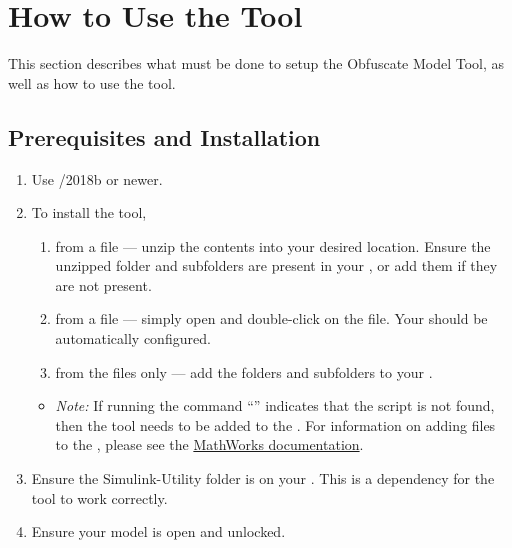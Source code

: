 \documentclass{article}
\makeatletter
\newcommand{\ToolName}{Obfuscate Model Tool\@\xspace}
\makeatother
\begin{document}
%
	
\section{How to Use the Tool}
This section describes what must be done to setup the \ToolName, as well as how to use the tool.

\subsection{Prerequisites and Installation}

\begin{enumerate}
  \item Use \Matlab/\Simulink 2018b or newer.
	\item To install the tool,
	\begin{enumerate}
		\item from a  file --- unzip the contents into your desired location. Ensure the unzipped folder and subfolders are present in your \mpath, or add them if they are not present.
		\item from a  file --- simply open \Matlab and double-click on the file. Your \mpath should be automatically configured.
		\item from the files only --- add the folders and subfolders to your \mpath. %
	\end{enumerate}
	\begin{itemize}
		\item \textit{Note:} If running the command ``'' indicates that the script is not found, then the tool needs to be added to the \mpath.
		For information on adding files to the \mpath, please see the \href{https://www.mathworks.com/help/matlab/matlab_env/add-remove-or-reorder-folders-on-the-search-path.html}{MathWorks documentation}.
	\end{itemize}
	\item Ensure the Simulink-Utility folder is on your \mpath. This is a dependency for the tool to work correctly.
	\item Ensure your model is open and unlocked.
\end{enumerate}
\end{document}
